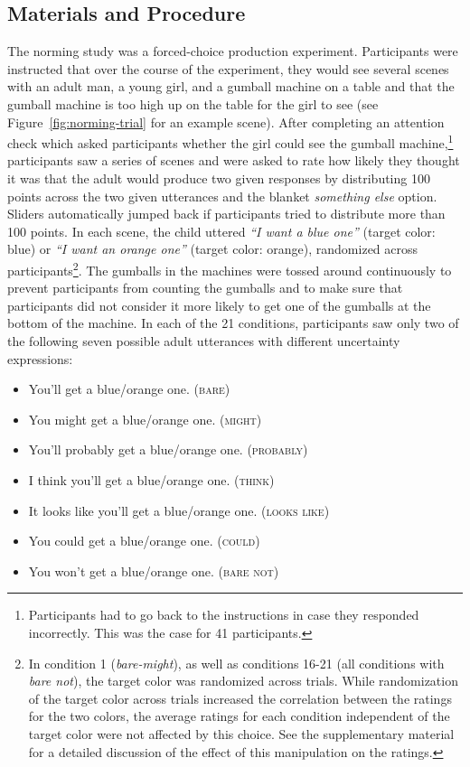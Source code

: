 \documentclass[lucida,biblatex]{sp} %
\begin{document}
\subsection{Materials and Procedure}
The norming study was a forced-choice production experiment. Participants were instructed 
that over the course of the experiment, they would see several scenes with an adult man, 
a young girl, and a gumball machine on a table and 
that the gumball machine is too high up on the table for the girl to see (see Figure~\ref{fig:norming-trial} for an example scene). 
After completing an attention check which asked participants whether 
the girl could see the gumball machine,\footnote{Participants had to go back to the instructions in case they responded incorrectly. This was the case for 41 participants.} 
participants saw a series of scenes  and were asked to rate how likely they thought it was that the 
adult would produce two given responses by distributing 100 points across the two given utterances and the 
blanket \textit{something else} option. Sliders automatically jumped back if participants tried to distribute more than 100 points. 
In each scene, the child uttered \textit{``I want a blue one''} (target color: blue) or  \textit{``I want an orange one''} (target color: orange), randomized across participants\footnote{In condition 1 (\textit{bare-might}), as well as conditions 16-21 (all conditions with \textit{bare not}), the target color was randomized across trials. While randomization of the target color across trials increased the correlation between the ratings for the two colors,  the average ratings for each condition independent of the target color were not affected by this choice. See the supplementary material for a detailed discussion of the effect of this manipulation on the ratings.}. The gumballs in the machines were tossed around continuously to prevent participants from counting the gumballs
and to make sure that participants did not consider it more likely to get one of the gumballs at the bottom of the machine.
 In each of the 21 conditions, participants saw only  two of the following seven possible adult utterances with different uncertainty expressions:

 \begin{itemize}
\item You'll get a blue/orange one. (\textsc{bare})
\item You might get a blue/orange one. (\textsc{might})
\item You'll probably get a blue/orange one. (\textsc{probably})
\item I think you'll get a blue/orange one. (\textsc{think})
\item It looks like you'll get a blue/orange one. (\textsc{looks like})
\item You could get a blue/orange one. (\textsc{could})
\item You won't get a blue/orange one. (\textsc{bare not})
\end{itemize}
\end{document}
